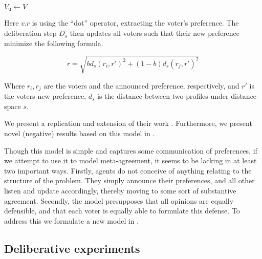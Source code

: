 \IncMargin{1em}
\begin{algorithm}

	\BlankLine

	$V_{\text{u}} \gets V$ \\

\end{algorithm}
\DecMargin{1em}

Here $v.r$ is using the ``dot'' operator, extracting the voter's preference.
The deliberation step $D_s$ then updates all voters such that their new
preference  minimize the following formula.

\begin{equation}
	r =
	\sqrt{
		b d_s(r_i, r')^2 + (1-b)d_s(r_j, r')^2
	}
	\label{eq:deliberation_step_formula}
\end{equation}

Where $r_i, r_j$ are the voters and the announced preference, respectively, and
$r'$ is the voters new preference, $d_s$ is the distance between two profiles
under distance space $s$.

We present a replication and extension of their work .
Furthermore, we present novel (negative) results based on this model in
.

Though this model is simple and captures some communication of preferences, if
we attempt to use it to model meta-agreement, it seems to be lacking in at
least two important ways. Firstly, agents do not conceive of anything relating
to the structure of the problem. They simply announce their preferences, and
all other listen and update accordingly, thereby moving to some sort of
substantive agreement. Secondly, the model presupposes that all opinions are
equally defensible, and that each voter is equally able to formulate this
defense. To address this we formulate a new model in .


\subsection{Deliberative experiments}

